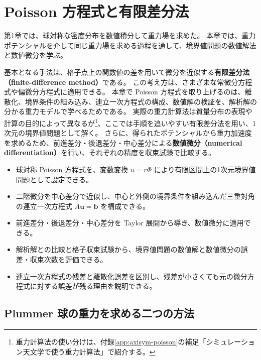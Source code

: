 \chapter{Poisson 方程式と有限差分法}
\label{chap:poisson-fd}

第1章では、球対称な密度分布を数値積分して重力場を求めた。
本章では、重力ポテンシャルを介して同じ重力場を求める過程を通して、境界値問題の数値解法と数値微分を学ぶ。

基本となる手法は、格子点上の関数値の差を用いて微分を近似する\textbf{有限差分法（finite-difference method）}である。
この考え方は、さまざまな常微分方程式や偏微分方程式に適用できる。
本章で Poisson 方程式を取り上げるのは、離散化、境界条件の組み込み、連立一次方程式の構成、数値解の検証を、解析解の分かる重力モデルで学べるためである。
実際の重力計算法は質量分布の表現や計算の目的によって異なるが\footnote{重力計算法の使い分けは、付録\ref{app:axisym-poisson}の補足「シミュレーション天文学で使う重力計算法」で紹介する。}、ここでは手順を追いやすい有限差分法を用い、1次元の境界値問題として解く。
さらに、得られたポテンシャルから重力加速度を求めるため、前進差分・後退差分・中心差分による\textbf{数値微分（numerical differentiation）}を行い、それぞれの精度を収束試験で比較する。

\begin{learningbox}[本章で学ぶこと]
\begin{itemize}
 \item 球対称 Poisson 方程式を、変数変換 $u=r\Phi$ により有限区間上の1次元境界値問題として設定できる。
 \item 二階微分を中心差分で近似し、中心と外側の境界条件を組み込んだ三重対角の連立一次方程式 $A\boldsymbol{u}=\boldsymbol{b}$ を構成できる。
 \item 前進差分・後退差分・中心差分を Taylor 展開から導き、数値微分に適用できる。
 \item 解析解との比較と格子収束試験から、境界値問題の数値解と数値微分の誤差・収束次数を評価できる。
 \item 連立一次方程式の残差と離散化誤差を区別し、残差が小さくても元の微分方程式に対する誤差が残る理由を説明できる。
\end{itemize}
\end{learningbox}



\section{Plummer 球の重力を求める二つの方法}
\label{sec:ch2-plummer}

